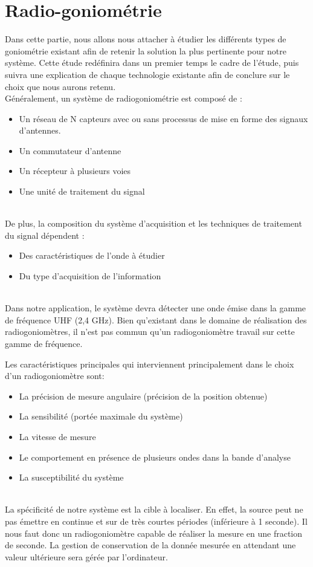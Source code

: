 \chapter{Radio-goniométrie}



Dans cette partie, nous allons nous attacher à étudier les différents types de goniométrie existant afin de retenir la solution la plus pertinente pour notre système. Cette étude redéfinira dans un premier temps le cadre de l’étude, puis suivra une explication de chaque technologie existante afin de conclure sur le choix que nous aurons retenu.
~\\

Généralement, un système de radiogoniométrie est composé de  :

\begin{itemize}
\item Un réseau de N capteurs avec ou sans processus de mise en forme des signaux d’antennes.

\item Un commutateur d’antenne
\item Un récepteur à plusieurs voies
\item Une unité de traitement du signal

\end{itemize}
~\\
De plus, la composition du système d’acquisition et les techniques de traitement du signal dépendent :
\begin{itemize}
\item  Des caractéristiques de l’onde à étudier
\item  Du type d’acquisition de l’information
\end{itemize}
~\\
Dans notre application, le système devra détecter une onde émise dans la gamme de fréquence UHF (2,4 GHz). Bien qu’existant dans le domaine de réalisation des radiogoniomètres, il n’est pas commun qu’un radiogoniomètre travail sur cette gamme de fréquence.

Les caractéristiques principales qui interviennent principalement dans le choix d’un radiogoniomètre sont:

\begin{itemize}
\item La précision de mesure angulaire (précision de la position obtenue)
\item La sensibilité (portée maximale du système) 
\item La vitesse de mesure
\item Le comportement en présence de plusieurs ondes dans la bande d’analyse
\item La susceptibilité du système
\end{itemize}
~\\
La spécificité de notre système est la cible à localiser. En effet, la source peut ne pas émettre en  continue et sur de très courtes périodes (inférieure à 1 seconde). Il nous faut donc un radiogoniomètre capable de réaliser la mesure en une fraction de seconde. La gestion de conservation de la donnée mesurée en attendant une valeur ultérieure sera gérée par l’ordinateur.


